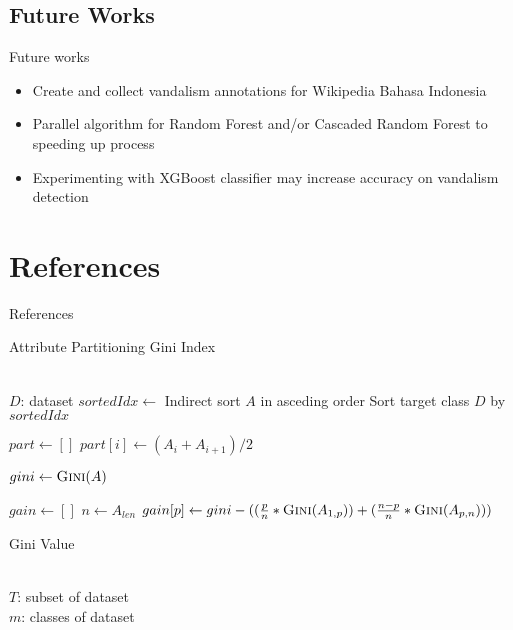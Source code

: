\documentclass{beamer}
\begin{document}
\subsection{Future Works}
\begin{frame}
	{Future works}
	\begin{itemize}
		\item Create and collect vandalism annotations for Wikipedia Bahasa
		Indonesia
		\item Parallel algorithm for Random Forest and/or Cascaded Random
		Forest to speeding up process
		\item Experimenting with XGBoost classifier may increase accuracy on
		vandalism detection
	\end{itemize}
\end{frame}

\section*{References}

\begin{frame}{References}
\printbibliography
\end{frame}

\begin{frame}
	{Attribute Partitioning}
	{Gini Index}
	\small
	\begin{algorithmic}[1]
		\Require \\
		$ D $: dataset
				\State $ sortedIdx \gets $ Indirect sort $A$ in asceding
				order
				\State Sort target class $D$ by $ sortedIdx $

				\State $ part \gets [ ] $
					\State $ part[i] \gets (A_{i} + A_{i+1}) / 2 $
				\EndFor

				\State $ gini \gets \Call{Gini}{A} $

				\State $ gain \gets [ ] $
				\State $ n \gets A_{len} $
					\State $ gain[p] \gets gini - (
						(\frac{p}{n} * \Call{Gini}{A_{1,p}})
						+
						(\frac{n - p}{n} * \Call{Gini}{A_{p,n}})
						)
						$
				\EndFor
			\EndFor
		\EndFunction
	\end{algorithmic}
\end{frame}

\begin{frame}
	{Gini Value}
	\begin{algorithmic}[1]
		\Require \\
		$ T $: subset of dataset \\
		$ m $: classes of dataset
			\State {}
		\EndFunction
	\end{algorithmic}
\end{frame}
\end{document}
